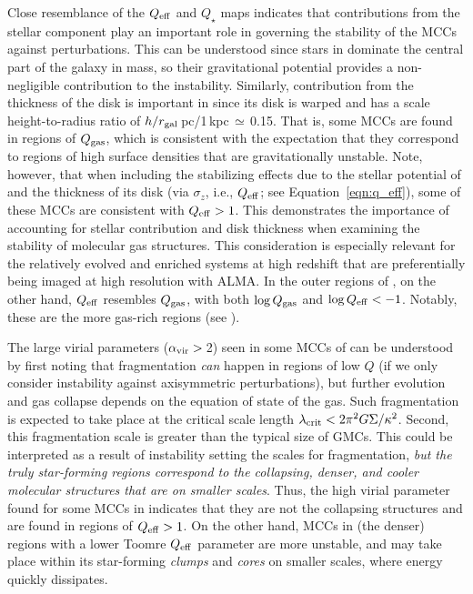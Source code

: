 \IfFileExists{emulateapjlegacy.cls}{\documentclass[iop]{emulateapjlegacy}}{\documentclass[iop]{emulateapj}}
\begin{document}
Close resemblance of the $Q_{\rm eff}$ and $Q_{\star}$ maps indicates that contributions from the stellar component play an important role in governing the stability of the MCCs against perturbations. This can be understood since stars in \flower dominate the central part of the galaxy in mass, so their gravitational potential provides a non-negligible contribution to the instability. 
Similarly, contribution from the thickness of the disk is important in \flower since its disk is warped and has a scale height-to-radius ratio of $h/r_{\rm gal}$\,pc/1\,kpc\,$\simeq$\,0.15.
%
That is, some MCCs are found in regions of $Q_{\rm gas}$, which is consistent with the expectation that they correspond to regions of high surface densities that are gravitationally unstable. Note, however, that when including the stabilizing effects due to the stellar potential of \flower and the thickness of its disk (via $\sigma_z$, i.e., $Q_{\rm eff}$; see Equation~\ref{eqn:q_eff}), some of these MCCs are consistent with $Q_{\rm eff} > 1$.
%
This demonstrates the importance of accounting for stellar contribution and disk thickness when examining the stability of molecular gas structures. This consideration is especially relevant for the relatively evolved and enriched systems at high redshift that are preferentially being imaged at high resolution with ALMA. In the outer regions of \flower, on the other hand, $Q_{\rm eff}$ resembles $Q_{\rm gas}$, with both $\log{Q_{\rm gas}}$ and $\log{Q_{\rm eff}} < -1$. Notably, these are the more gas-rich regions (see ).

The large virial parameters ($\alpha_{\rm vir}>$\,2) seen in some MCCs of \flower can be understood by first noting that fragmentation {\em can} happen in regions of low $Q$ (if we only consider instability against axisymmetric perturbations), but further evolution and gas collapse depends on the equation of state of the gas.
%
Such fragmentation is expected to take place at the critical scale length $\lambda_{\rm crit} < 2 \pi^2 G \Sigma / \kappa^2$. Second, this fragmentation scale is greater than the typical size of GMCs.
%
This could be interpreted as a result of instability setting the scales for fragmentation, {\em but the truly star-forming regions correspond to the collapsing, denser, and cooler molecular structures that are on smaller scales}.
%
Thus, the high virial parameter found for some MCCs in \flower indicates that they are not the collapsing structures and are found in regions of $Q_{\rm eff}>1$. On the other hand, MCCs in (the denser) regions with a lower Toomre $Q_{\rm eff}$ parameter are more unstable, and \SF may take place within its star-forming {\it clumps} and {\it cores} on smaller scales, where energy quickly dissipates.
\end{document}
